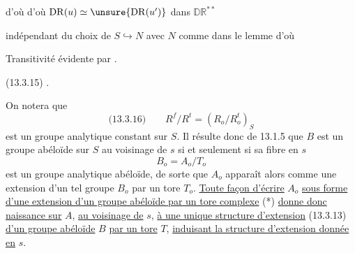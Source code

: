 
d'où
d'où $\mathrm{DR}(u)\simeq\unsure{\mathrm{DR}(u')}$ dans $\mathbb{DR}^{**}$

indépendant du choix de $S\hookrightarrow N$ avec $N$ comme dans le lemme
d'où

Transitivité évidente par .



(13.3.15)
.

On notera que
\[
\text{(13.3.16)}\qquad R^f/R^t=(R_o/R_o^t)_S
\]
est un groupe analytique constant sur $S$. Il résulte donc de 13.1.5 que $B$ est un groupe abéloïde sur $S$ au voisinage de $s$ si et seulement si sa fibre en $s$
\[
B_o=A_o/T_o
\]
est un groupe analytique abéloïde, de sorte que $A_o$ apparaît alors comme une extension d'un tel groupe $B_o$ par un tore $T_o$. \uline{Toute façon d'écrire} $A_o$ \uline{sous forme d'une extension d'un groupe abéloïde par un tore complexe} (*) \uline{donne donc naissance sur} $A$, \uline{au voisinage de} $s$, \uline{à une unique structure d'extension} (13.3.13) \uline{d'un groupe abéloïde} $B$ \uline{par un tore} $T$, \uline{induisant la structure d'extension donnée en} $s$.

